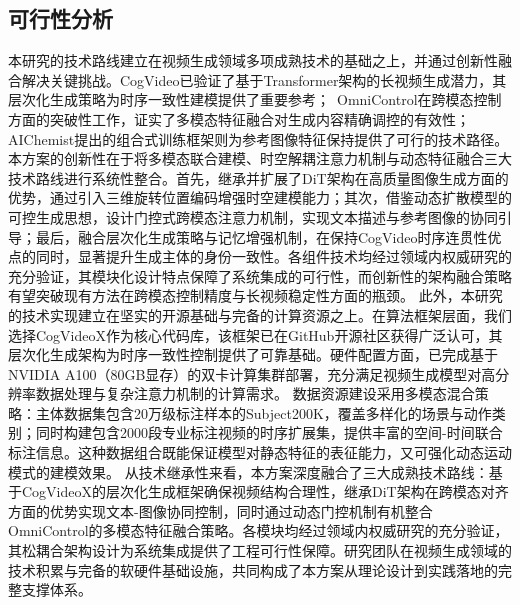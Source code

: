 \subsection{可行性分析}
本研究的技术路线建立在视频生成领域多项成熟技术的基础之上，并通过创新性融合解决关键挑战。CogVideo\cite{hong2022cogvideo}已验证了基于Transformer架构的长视频生成潜力，其层次化生成策略为时序一致性建模提供了重要参考；\
OmniControl\cite{tan2024ominicontrol}在跨模态控制方面的突破性工作，证实了多模态特征融合对生成内容精确调控的有效性；AIChemist\cite{chen2025multi}提出的组合式训练框架则为参考图像特征保持提供了可行的技术路径。
本方案的创新性在于将多模态联合建模、时空解耦注意力机制与动态特征融合三大技术路线进行系统性整合。首先，继承并扩展了DiT架构在高质量图像生成方面的优势，通过引入三维旋转位置编码增强时空建模能力；其次，借鉴动态扩散模型的可控生成思想，设计门控式跨模态注意力机制，实现文本描述与参考图像的协同引导；最后，融合层次化生成策略与记忆增强机制，在保持CogVideo时序连贯性优点的同时，显著提升生成主体的身份一致性。各组件技术均经过领域内权威研究的充分验证，其模块化设计特点保障了系统集成的可行性，而创新性的架构融合策略有望突破现有方法在跨模态控制精度与长视频稳定性方面的瓶颈。
此外，本研究的技术实现建立在坚实的开源基础与完备的计算资源之上。在算法框架层面，我们选择CogVideoX作为核心代码库，该框架已在GitHub开源社区获得广泛认可，其层次化生成架构为时序一致性控制提供了可靠基础。硬件配置方面，已完成基于NVIDIA A100（80GB显存）的双卡计算集群部署，充分满足视频生成模型对高分辨率数据处理与复杂注意力机制的计算需求。
数据资源建设采用多模态混合策略：主体数据集包含20万级标注样本的Subject200K，覆盖多样化的场景与动作类别；同时构建包含2000段专业标注视频的时序扩展集，提供丰富的空间-时间联合标注信息。这种数据组合既能保证模型对静态特征的表征能力，又可强化动态运动模式的建模效果。
从技术继承性来看，本方案深度融合了三大成熟技术路线：基于CogVideoX的层次化生成框架确保视频结构合理性，继承DiT架构在跨模态对齐方面的优势实现文本-图像协同控制，同时通过动态门控机制有机整合OmniControl的多模态特征融合策略。各模块均经过领域内权威研究的充分验证，其松耦合架构设计为系统集成提供了工程可行性保障。研究团队在视频生成领域的技术积累与完备的软硬件基础设施，共同构成了本方案从理论设计到实践落地的完整支撑体系。